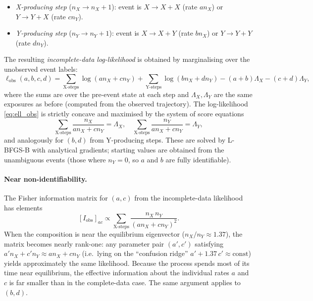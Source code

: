 \documentclass[12pt]{article}
\begin{document}
\begin{itemize}
  \item \emph{X-producing step} ($n_X \to n_X+1$): event is
        $X\!\to\!X{+}X$ (rate $a n_X$) or $Y\!\to\!Y{+}X$ (rate $c n_Y$).
  \item \emph{Y-producing step} ($n_Y \to n_Y+1$): event is
        $X\!\to\!X{+}Y$ (rate $b n_X$) or $Y\!\to\!Y{+}Y$ (rate $d n_Y$).
\end{itemize}

The resulting \emph{incomplete-data log-likelihood} is obtained by
marginalising over the unobserved event labels:
\begin{equation}
  \ell_{\mathrm{obs}}(a,b,c,d)
  = \sum_{\text{X-steps}} \log(a n_X + c n_Y)
  + \sum_{\text{Y-steps}} \log(b n_X + d n_Y)
  - (a+b)\Lambda_X - (c+d)\Lambda_Y,
  \label{eq:ell_obs}
\end{equation}
where the sums are over the pre-event state at each step and
$\Lambda_X, \Lambda_Y$ are the same exposures as before (computed from
the observed trajectory).  The log-likelihood \eqref{eq:ell_obs} is
strictly concave and maximised by the system of score equations
\begin{equation}
  \sum_{\text{X-steps}} \frac{n_X}{a n_X + c n_Y} = \Lambda_X, \quad
  \sum_{\text{X-steps}} \frac{n_Y}{a n_X + c n_Y} = \Lambda_Y,
  \label{eq:score_obs}
\end{equation}
and analogously for $(b,d)$ from Y-producing steps.  These are solved by
L-BFGS-B with analytical gradients; starting values are obtained from the
unambiguous events (those where $n_Y = 0$, so $a$ and $b$ are fully
identifiable).

\paragraph{Near non-identifiability.}
The Fisher information matrix for $(a,c)$ from the incomplete-data
likelihood has elements
\[
  [I_{\mathrm{obs}}]_{ac}
  \propto \sum_{\text{X-steps}} \frac{n_X \, n_Y}{(a n_X + c n_Y)^2}.
\]
When the composition is near the equilibrium eigenvector
($n_X/n_Y \approx 1.37$), the matrix becomes nearly rank-one: any
parameter pair $(a',c')$ satisfying $a' n_X + c' n_Y \approx a n_X +
c n_Y$ (i.e.\ lying on the ``confusion ridge''
$a' + 1.37\,c' \approx \mathrm{const}$) yields approximately the same
likelihood.  Because the process spends most of its time near equilibrium,
the effective information about the individual rates $a$ and $c$ is far
smaller than in the complete-data case.  The same argument applies to
$(b,d)$.
\end{document}
